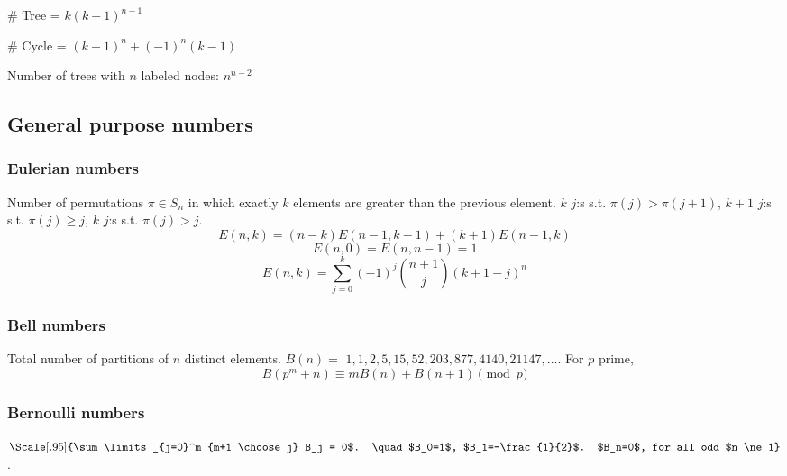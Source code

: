   # Tree = \( k(k - 1)^{n - 1} \)

  # Cycle = \( (k - 1)^n + (-1)^n (k - 1) \)

\item Number of trees with $ n $ labeled nodes: $ n^{n - 2} $

\subsection{General purpose numbers}
  \subsubsection{Eulerian numbers}
    Number of permutations $\pi \in S_n$ in which exactly $k$ elements are greater than the previous element. $k$ $j$:s s.t. $\pi(j)>\pi(j+1)$, $k+1$ $j$:s s.t. $\pi(j)\geq j$, $k$ $j$:s s.t. $\pi(j)>j$.
    $$E(n,k) = (n-k)E(n-1,k-1) + (k+1)E(n-1,k)$$
    $$E(n,0) = E(n,n-1) = 1$$
    $$E(n,k) = \sum_{j=0}^k(-1)^j\binom{n+1}{j}(k+1-j)^n$$

    



  

  \subsubsection{Bell numbers}
    Total number of partitions of $n$ distinct elements. $B(n) =$
    $1, 1, 2, 5, 15, 52, 203, 877, 4140, 21147, \dots$. For $p$ prime,
    \[ B(p^m+n)\equiv mB(n)+B(n+1) \pmod{p} \]

  \subsubsection{Bernoulli numbers}
  $\Scale[.95]{\sum\limits_{j=0}^m {m+1 \choose j} B_j = 0$.
  \quad $B_0=1$, $B_1=-\frac{1}{2}$. $B_n=0$, for all odd $n \ne 1}$.

